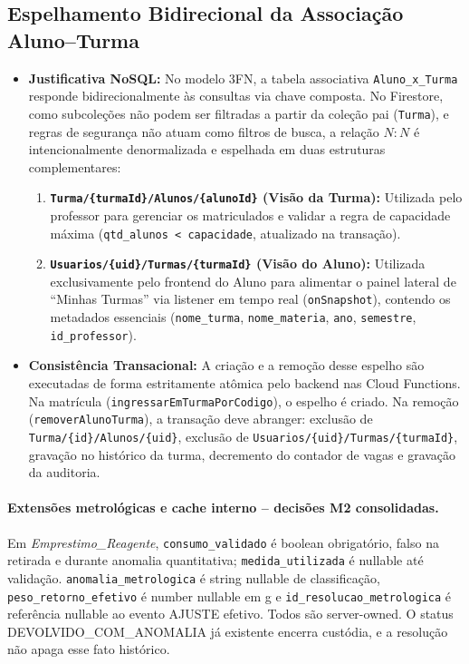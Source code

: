 \subsection{Espelhamento Bidirecional da Associação Aluno--Turma}
\begin{itemize}
    \item \textbf{Justificativa NoSQL:} No modelo 3FN, a tabela associativa \texttt{Aluno\_x\_Turma} responde bidirecionalmente às consultas via chave composta. No Firestore, como subcoleções não podem ser filtradas a partir da coleção pai (\texttt{Turma}), e regras de segurança não atuam como filtros de busca, a relação $N:N$ é intencionalmente denormalizada e espelhada em duas estruturas complementares:
    \begin{enumerate}
        \item \textbf{\nolinkurl{Turma/\{turmaId\}/Alunos/\{alunoId\}} (Visão da Turma):} Utilizada pelo professor para gerenciar os matriculados e validar a regra de capacidade máxima (\texttt{qtd\_alunos < capacidade}, atualizado na transação).
        \item \textbf{\nolinkurl{Usuarios/\{uid\}/Turmas/\{turmaId\}} (Visão do Aluno):} Utilizada exclusivamente pelo frontend do Aluno para alimentar o painel lateral de ``Minhas Turmas'' via listener em tempo real (\texttt{onSnapshot}), contendo os metadados essenciais (\texttt{nome\_turma}, \texttt{nome\_materia}, \texttt{ano}, \texttt{semestre}, \texttt{id\_professor}).
    \end{enumerate}
    \item \textbf{Consistência Transacional:} A criação e a remoção desse espelho são executadas de forma estritamente atômica pelo backend nas Cloud Functions. Na matrícula (\texttt{ingressarEmTurmaPorCodigo}), o espelho é criado. Na remoção (\texttt{removerAlunoTurma}), a transação deve abranger: exclusão de \nolinkurl{Turma/\{id\}/Alunos/\{uid\}}, exclusão de \nolinkurl{Usuarios/\{uid\}/Turmas/\{turmaId\}}, gravação no histórico da turma, decremento do contador de vagas e gravação da auditoria.
\end{itemize}

\paragraph{Extensões metrológicas e cache interno -- decisões M2 consolidadas.}
Em \textit{Emprestimo\_Reagente}, \texttt{consumo\_validado} é boolean obrigatório, falso na retirada e durante anomalia quantitativa; \texttt{medida\_utilizada} é nullable até validação. \texttt{anomalia\_metrologica} é string nullable de classificação, \texttt{peso\_retorno\_efetivo} é number nullable em g e \texttt{id\_resolucao\_metrologica} é referência nullable ao evento AJUSTE efetivo. Todos são server-owned. O status DEVOLVIDO\_COM\_ANOMALIA já existente encerra custódia, e a resolução não apaga esse fato histórico.

